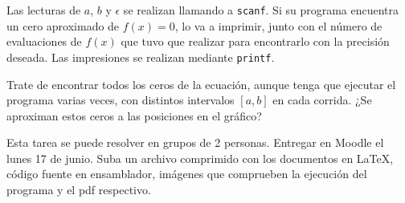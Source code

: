 \documentclass[12pt,letterpaper]{article}
\begin{document}
 Las lecturas de $a$, $b$ y $\epsilon$ se realizan llamando a \texttt{scanf}. Si su programa encuentra un cero aproximado de $f(x) = 0$, lo va a imprimir, junto con el número de evaluaciones de $f(x)$ que tuvo que realizar para encontrarlo con la precisión deseada. Las impresiones se realizan mediante \texttt{printf}.
 
 Trate de encontrar todos los ceros de la ecuación, aunque tenga que ejecutar el programa varias veces, con distintos intervalos $[a, b]$ en cada corrida. ¿Se aproximan estos ceros a las posiciones en el gráfico?
 
 \vspace{1 cm}
 Esta tarea se puede resolver en grupos de 2 personas. 
Entregar en Moodle el lunes 17 de junio. Suba un archivo comprimido con los documentos en \LaTeX, código fuente en ensamblador, imágenes que comprueben la ejecución del programa y el pdf respectivo.
\end{document}
